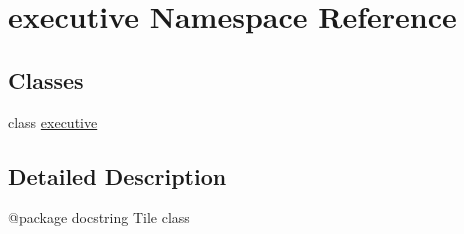 \hypertarget{namespaceexecutive}{}\section{executive Namespace Reference}
\label{namespaceexecutive}
\subsection*{Classes}
\begin{DoxyCompactItemize}
\item 
class \mbox{\hyperlink{classexecutive_1_1executive}{executive}}
\end{DoxyCompactItemize}


\subsection{Detailed Description}
\begin{DoxyVerb}@package docstring
Tile class
\end{DoxyVerb}
 